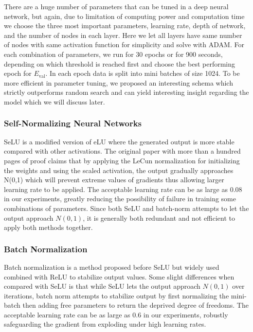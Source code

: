 \documentclass{article}
\begin{document}
There are a huge number of parameters that can be tuned in a deep neural network, but again, due to limitation of computing power and computation time we choose the three most important parameters, learning rate, depth of network, and the number of nodes in each layer. Here we let all layers have same number of nodes with same activation function for simplicity and solve with ADAM. For each combination of parameters, we run for 30 epochs or for 900 seconds, depending on which threshold is reached first and choose the best performing epoch for $E_\text{val}$. In each epoch data is split into mini batches of size 1024.
To be more efficient in parameter tuning, we proposed an interesting schema which strictly outperforms random search and can yield interesting insight regarding the model which we will discuss later.

\subsubsection*{Self-Normalizing Neural Networks}
SeLU is a modified version of eLU where the generated output is more stable compared with other activations. The original paper with more than a hundred pages of proof claims that by applying the LeCun normalization for initializing the weights and using the scaled activation, the output gradually approaches N(0,1) which will prevent extreme values of gradients thus allowing larger learning rate to be applied. The acceptable learning rate can be as large as 0.08 in our experiments, greatly reducing the possibility of failure in training some combinations of parameters. Since both SeLU and batch-norm attempts to let the output approach $N(0,1)$, it is generally both redundant and not efficient to apply both methods together.

\subsubsection*{Batch Normalization}
Batch normalization is a method proposed before SeLU but widely used combined with ReLU to stabilize output values. Some slight differences when compared with SeLU is that while SeLU lets the output approach $N(0,1)$ over iterations, batch norm attempts to stabilize output by first normalizing the mini-batch then adding free parameters to return the deprived degree of freedoms. The acceptable learning rate can be as large as 0.6 in our experiments, robustly safeguarding the gradient from exploding under high learning rates.
\end{document}
